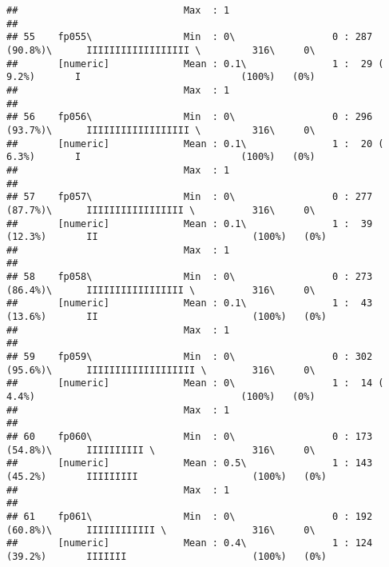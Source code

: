 \documentclass[]{article}
\begin{document}
\begin{verbatim}
##                             Max  : 1                                                                                       
## 
## 55    fp055\                Min  : 0\                 0 : 287 (90.8%)\      IIIIIIIIIIIIIIIIII \         316\     0\       
##       [numeric]             Mean : 0.1\               1 :  29 ( 9.2%)       I                            (100%)   (0%)     
##                             Max  : 1                                                                                       
## 
## 56    fp056\                Min  : 0\                 0 : 296 (93.7%)\      IIIIIIIIIIIIIIIIII \         316\     0\       
##       [numeric]             Mean : 0.1\               1 :  20 ( 6.3%)       I                            (100%)   (0%)     
##                             Max  : 1                                                                                       
## 
## 57    fp057\                Min  : 0\                 0 : 277 (87.7%)\      IIIIIIIIIIIIIIIII \          316\     0\       
##       [numeric]             Mean : 0.1\               1 :  39 (12.3%)       II                           (100%)   (0%)     
##                             Max  : 1                                                                                       
## 
## 58    fp058\                Min  : 0\                 0 : 273 (86.4%)\      IIIIIIIIIIIIIIIII \          316\     0\       
##       [numeric]             Mean : 0.1\               1 :  43 (13.6%)       II                           (100%)   (0%)     
##                             Max  : 1                                                                                       
## 
## 59    fp059\                Min  : 0\                 0 : 302 (95.6%)\      IIIIIIIIIIIIIIIIIII \        316\     0\       
##       [numeric]             Mean : 0\                 1 :  14 ( 4.4%)                                    (100%)   (0%)     
##                             Max  : 1                                                                                       
## 
## 60    fp060\                Min  : 0\                 0 : 173 (54.8%)\      IIIIIIIIII \                 316\     0\       
##       [numeric]             Mean : 0.5\               1 : 143 (45.2%)       IIIIIIIII                    (100%)   (0%)     
##                             Max  : 1                                                                                       
## 
## 61    fp061\                Min  : 0\                 0 : 192 (60.8%)\      IIIIIIIIIIII \               316\     0\       
##       [numeric]             Mean : 0.4\               1 : 124 (39.2%)       IIIIIII                      (100%)   (0%)     

\end{verbatim}
\end{document}
